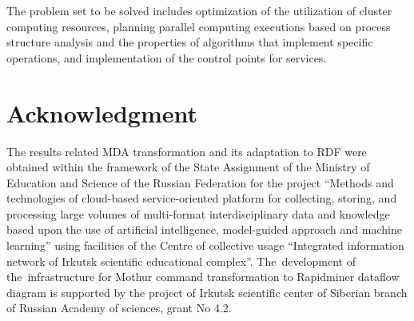 \documentclass[a4paper]{jpconf}
\begin{document}
The problem set to be solved includes optimization of the utilization of cluster computing resources, planning parallel computing executions based on process structure analysis and the properties of algorithms that implement specific operations, and implementation of the control points for services.

\section*{Acknowledgment}
The results related MDA transformation and its adaptation to RDF were obtained within the framework of the State Assignment of the Ministry of Education and Science of the Russian Federation for the project ``Methods and technologies of cloud-based service-oriented platform for collecting, storing, and processing large volumes of multi-format interdisciplinary data and knowledge based upon the use of artificial intelligence, model-guided approach and machine learning'' using facilities of the Centre of collective usage ``Integrated information network of Irkutsk scientific educational complex''. The~development of the~infrastructure for Mothur command transformation to Rapidminer dataflow diagram is supported by the project of Irkutsk scientific center of Siberian branch of Russian Academy of sciences, grant No 4.2.





\end{document}
